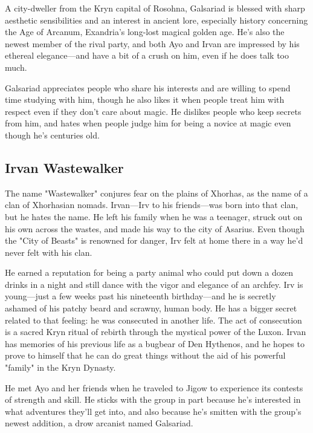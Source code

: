 \documentclass[letterpaper, 11pt, bg=full, twocolumn]{dndbook}
\begin{document}
A city-dweller from the Kryn capital of Rosohna, Galsariad is blessed with sharp aesthetic sensibilities and an interest in ancient lore, especially history concerning the Age of Arcanum, Exandria's long-lost magical golden age. He's also the newest member of the rival party, and both Ayo and Irvan are impressed by his ethereal elegance---and have a bit of a crush on him, even if he does talk too much.

Galsariad appreciates people who share his interests and are willing to spend time studying with him, though he also likes it when people treat him with respect even if they don't care about magic. He dislikes people who keep secrets from him, and hates when people judge him for being a novice at magic even though he's centuries old.

\subsection{Irvan Wastewalker}


The name "Wastewalker" conjures fear on the plains of Xhorhas, as the name of a clan of Xhorhasian nomads. Irvan---Irv to his friends---was born into that clan, but he hates the name. He left his family when he was a teenager, struck out on his own across the wastes, and made his way to the city of Asarius. Even though the "City of Beasts" is renowned for danger, Irv felt at home there in a way he'd never felt with his clan.

He earned a reputation for being a party animal who could put down a dozen drinks in a night and still dance with the vigor and elegance of an archfey. Irv is young---just a few weeks past his nineteenth birthday---and he is secretly ashamed of his patchy beard and scrawny, human body. He has a bigger secret related to that feeling: he was consecuted in another life. The act of consecution is a sacred Kryn ritual of rebirth through the mystical power of the Luxon. Irvan has memories of his previous life as a bugbear of Den Hythenos, and he hopes to prove to himself that he can do great things without the aid of his powerful "family" in the Kryn Dynasty.

He met Ayo and her friends when he traveled to Jigow to experience its contests of strength and skill. He sticks with the group in part because he's interested in what adventures they'll get into, and also because he's smitten with the group's newest addition, a drow arcanist named Galsariad.
\end{document}
